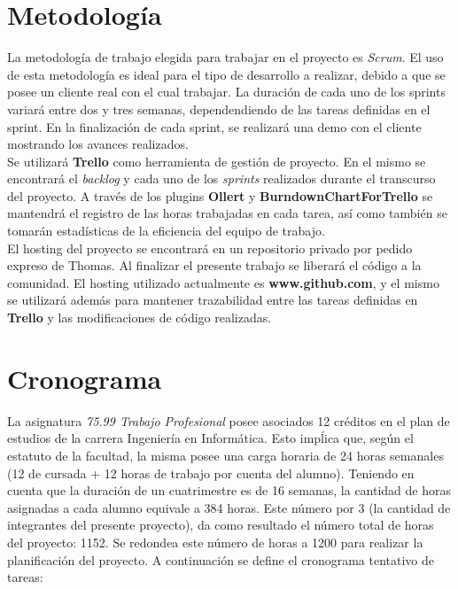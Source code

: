 \documentclass[a4paper,10pt]{article}
\begin{document}
    \newpage
    \section{Metodología}
        La metodología de trabajo elegida para trabajar en el proyecto es \textit{Scrum}. El uso de esta metodología es ideal para el tipo
        de desarrollo a realizar, debido a que se posee un cliente real con el cual trabajar. La duración de cada uno de
        los sprints variará entre dos y tres semanas, dependendiendo de las tareas definidas en el sprint. En la finalización de cada
        sprint, se realizará una demo con el cliente mostrando los avances realizados. \\
        \indent Se utilizará \textbf{Trello} como herramienta de gestión de proyecto. En el mismo se encontrará el \textit{backlog} y
        cada uno de los \textit{sprints} realizados durante el transcurso del proyecto. A través de los plugins \textbf{Ollert} y
        \textbf{BurndownChartForTrello} se mantendrá el registro de las horas trabajadas en cada tarea, así como también se tomarán
        estadísticas de la eficiencia del equipo de trabajo. \\
        \indent El hosting del proyecto se encontrará en un repositorio privado por pedido expreso de Thomas. Al finalizar el presente
        trabajo se liberará el código a la comunidad. El hosting utilizado actualmente es \textbf{www.github.com}, y el mismo se utilizará
        además para mantener trazabilidad entre las tareas definidas en \textbf{Trello} y las modificaciones de código realizadas.



    \newpage
    \section{Cronograma}
        La asignatura \textit{75.99 Trabajo Profesional} posee asociados 12 créditos en el plan de estudios de la carrera Ingeniería en
        Informática. Esto impĺica que, según el estatuto de la facultad, la misma posee una carga horaria de 24 horas semanales (12 de
        cursada + 12 horas de trabajo por cuenta del alumno). Teniendo en cuenta que la duración de un cuatrimestre es de 16 semanas,
        la cantidad de horas asignadas a cada alumno equivale a 384 horas. Este número por 3 (la cantidad de integrantes del presente
        proyecto), da como resultado el número total de horas del proyecto: 1152. Se redondea este número de horas a 1200 para realizar
        la planificación del proyecto. A continuación se define el cronograma tentativo de tareas:
\end{document}
